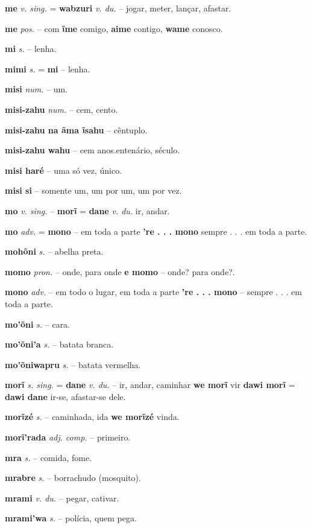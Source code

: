 \textbf{me} \textit{v. sing.} = \textbf{wabzuri} \textit{v. du.} -- jogar, meter, lançar, afastar.

\textbf{me} \textit{pos.} -- com  \textbf{ĩme} comigo, \textbf{aime} contigo, \textbf{wame} conosco.

\textbf{mi} \textit{s.} -- lenha.

\textbf{mimi} \textit{s.} = \textbf{mi} -- lenha.

\textbf{misi} \textit{num.} -- um.

\textbf{misi-zahu} \textit{num.} -- cem, cento.

\textbf{misi-zahu na ãma ĩsahu} -- cêntuplo.

\textbf{misi-zahu wahu} -- cem anos.entenário, século.

\textbf{misi haré} -- uma só vez, único.

\textbf{misi si} -- somente um, um por um, um por vez.

\textbf{mo} \textit{v. sing.} -- \textbf{morĩ} = \textbf{dane} \textit{v. du.} ir, andar.

\textbf{mo} \textit{adv.} = \textbf{mono} -- em toda a parte  \textbf{'re . . . mono} sempre . . . em toda a parte.

\textbf{mohõni} \textit{s.} -- abelha preta.

\textbf{momo} \textit{pron.} -- onde, para onde  \textbf{e momo} -- onde? para onde?.

\textbf{mono} \textit{adv.} -- em todo o lugar, em toda a parte  \textbf{'re . . . mono} -- sempre . . . em toda a parte.

\textbf{mo'õni} \textit{s.} -- cara.

\textbf{mo'õni'a} \textit{s.} -- batata branca.

\textbf{mo'õniwapru} \textit{s.} -- batata vermelha.

\textbf{morĩ} \textit{s. sing.} = \textbf{dane} \textit{v. du.} -- ir, andar, caminhar  \textbf{we morĩ} vir  \textbf{dawi morĩ} = \textbf{dawi dane} ir-se, afastar-se dele.

\textbf{morĩzé} \textit{s.} -- caminhada, ida  \textbf{we morĩzé} vinda.

\textbf{morĩ'rada} \textit{adj. comp.} -- primeiro.

\textbf{mra} \textit{s.} -- comida, fome.

\textbf{mrabre} \textit{s.} -- borrachudo (mosquito).

\textbf{mrami} \textit{v. du.} -- pegar, cativar.

\textbf{mrami'wa} \textit{s.} -- polícia, quem pega.

